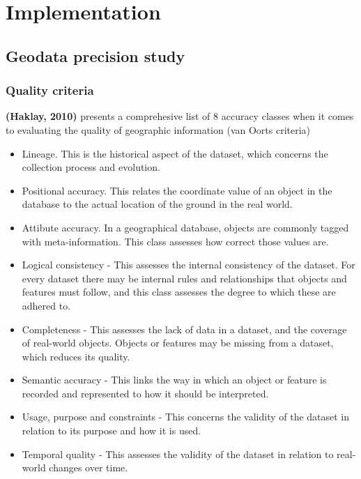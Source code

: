\documentclass{kththesis}
\begin{document}
\chapter{Implementation}

\section{Geodata precision study}

\subsection{Quality criteria}

\textbf{(Haklay, 2010)} presents a comprehesive list of 8 accuracy classes when it comes to evaluating the quality of geographic information (van Oorts criteria)

\begin{itemize}
  \item Lineage. This is the historical aspect of the dataset, which concerns the collection process and evolution.
  \item Positional accuracy. This relates the coordinate value of an object in the database to the actual location of the ground in the real world.
  \item Attibute accuracy. In a geographical database, objects are commonly tagged with meta-information. This class assesses how correct those values are.
  \item Logical consistency - This assesses the internal consistency of the dataset. For every dataset there may be internal rules and relationships that objects and features must follow, and this class assesses the degree to which these are adhered to.
  \item Completeness - This assesses the lack of data in a dataset, and the coverage of real-world objects. Objects or features may be missing from a dataset, which reduces its quality.
  \item Semantic accuracy - This links the way in which an object or feature is recorded and represented to how it should be interpreted.
  \item Usage, purpose and constraints - This concerns the validity of the dataset in relation to its purpose and how it is used.
  \item Temporal quality - This assesses the validity of the dataset in relation to real-world changes over time.
\end{itemize}
\end{document}
